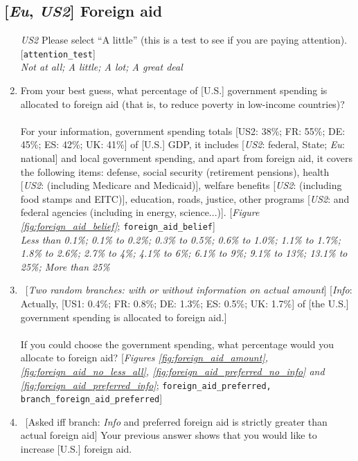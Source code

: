 \subsection*{[\textit{Eu}, \textit{US2}] Foreign aid}
\begin{enumerate}[resume] 
    \item [\textit{US2}] Please select ``A little'' (this is a test to see if you are paying attention). [\verb|attention_test|]
    \\ \textit{Not at all; A little; A lot; A great deal}
    \item  \label{q:foreign_aid_belief} From your best guess, what percentage of [U.S.] government spending is allocated to foreign aid (that is, to reduce poverty in low-income countries)?\\
 \\
    For your information, government spending totals [US2: 38\%; FR: 55\%; DE: 45\%; ES: 42\%; UK: 41\%] of [U.S.] GDP, it includes [\textit{US2}: federal, State; \textit{Eu}: national] and local government spending, and apart from foreign aid, it covers the following items: defense, social security (retirement pensions), health [\textit{US2}: (including Medicare and Medicaid)], welfare benefits [\textit{US2}: (including food stamps and EITC)], education, roads, justice, other programs [\textit{US2}: and federal agencies (including in energy, science...)]. [\textit{Figure \ref{fig:foreign_aid_belief}}; \verb|foreign_aid_belief|]
   \\ \textit{Less than 0.1\%; 0.1\% to 0.2\%; 0.3\% to 0.5\%; 0.6\% to 1.0\%; 1.1\% to 1.7\%; 1.8\% to 2.6\%; 2.7\% to 4\%; 4.1\% to 6\%; 6.1\% to 9\%; 9.1\% to 13\%; 13.1\% to 25\%; More than 25\%}
   \item \label{q:foreign_aid_preferred} ~[\textit{Two random branches: with or without information on actual amount}]  [\textit{Info}: Actually, [US1: 0.4\%; FR: 0.8\%; DE: 1.3\%; ES: 0.5\%; UK: 1.7\%] of [the U.S.] government spending is allocated to foreign aid.]\\
 \\
   If you could choose the government spending, what percentage would you allocate to foreign aid? [\textit{Figures \ref{fig:foreign_aid_amount}, \ref{fig:foreign_aid_no_less_all}, \ref{fig:foreign_aid_preferred_no_info} and \ref{fig:foreign_aid_preferred_info}}; \verb|foreign_aid_preferred, branch_foreign_aid_preferred|]
  \item  \label{q:foreign_aid_raise_how} ~[Asked iff branch: \textit{Info} and preferred foreign aid is strictly greater than actual foreign aid]  Your previous answer shows that you would like to increase [U.S.] foreign aid.\\

\end{enumerate}
